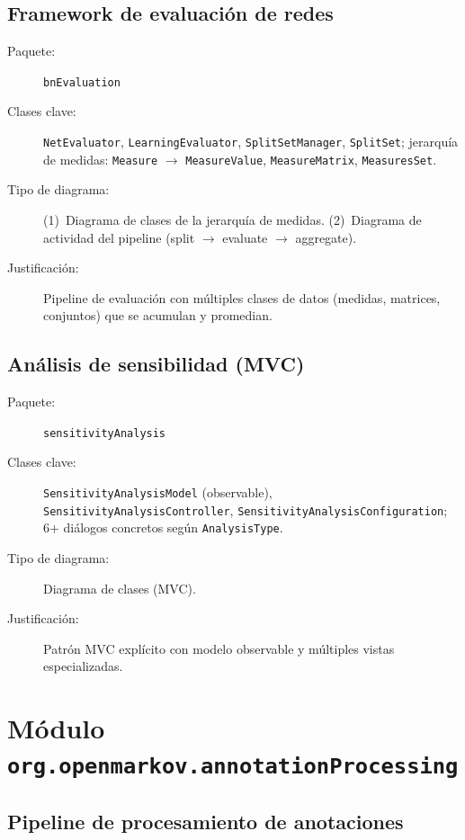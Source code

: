 \documentclass[11pt,a4paper]{article}
\newcommand{\code}[1]{\texttt{#1}}
\newcommand{\pkg}[1]{\texttt{\small #1}}
\begin{document}
\subsection{Framework de evaluaci\'on de redes}

\begin{description}
  \item[Paquete:] \pkg{bnEvaluation}
  \item[Clases clave:] \code{NetEvaluator}, \code{LearningEvaluator},
        \code{SplitSetManager}, \code{SplitSet}; jerarqu\'ia de
        medidas: \code{Measure} $\to$ \code{MeasureValue},
        \code{MeasureMatrix}, \code{MeasuresSet}.
  \item[Tipo de diagrama:] (1)~Diagrama de clases de la jerarqu\'ia
        de medidas. (2)~Diagrama de actividad del pipeline
        (split $\to$ evaluate $\to$ aggregate).
  \item[Justificaci\'on:] Pipeline de evaluaci\'on con m\'ultiples
        clases de datos (medidas, matrices, conjuntos) que se acumulan
        y promedian.
\end{description}

\subsection{An\'alisis de sensibilidad (MVC)}

\begin{description}
  \item[Paquete:] \pkg{sensitivityAnalysis}
  \item[Clases clave:] \code{SensitivityAnalysisModel} (observable),
        \code{SensitivityAnalysisController},
        \code{SensitivityAnalysisConfiguration};
        6+ di\'alogos concretos seg\'un \code{AnalysisType}.
  \item[Tipo de diagrama:] Diagrama de clases (MVC).
  \item[Justificaci\'on:] Patr\'on MVC expl\'icito con modelo
        observable y m\'ultiples vistas especializadas.
\end{description}

\section{M\'odulo \code{org.openmarkov.annotationProcessing}}

\subsection{Pipeline de procesamiento de anotaciones}
\end{document}
